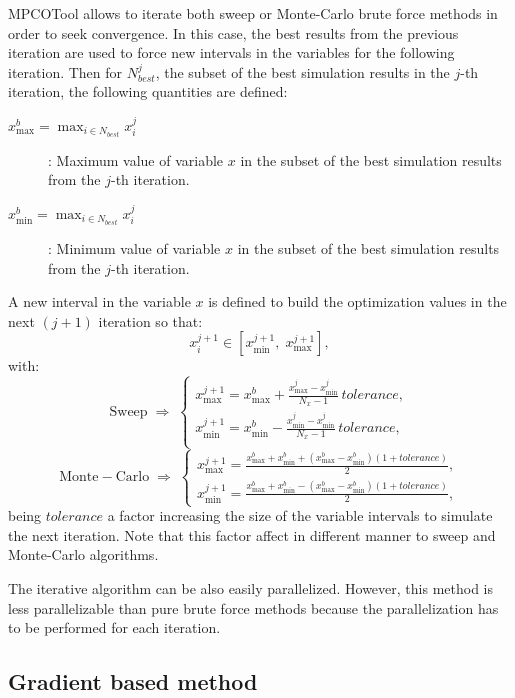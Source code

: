 \documentclass[review,authoryear]{elsarticle}
\newcommand{\EQ}[2]
{\begin{equation}#1\label{#2}\end{equation}}
\begin{document}
MPCOTool allows to iterate both sweep or Monte-Carlo brute force methods in
order to seek convergence. In this case, the best results from the previous
iteration are used to force new intervals in the variables for the following
iteration. Then for $N_{best}^j$, the subset of the best simulation results in
the $j$-th iteration, the following quantities are defined:
\begin{description}
\item[$\displaystyle x_{\max}^b=\max_{i\in N_{best}}x_i^j$]: Maximum value of
	variable $x$ in the subset of the best simulation results from the $j$-th
	iteration.
\item[$\displaystyle x_{\min}^b=\max_{i\in N_{best}}x_i^j$]: Minimum value of
	variable $x$ in the subset of the best simulation results from the $j$-th
	iteration.
\end{description}
A new interval in the variable $x$ is defined to build the optimization values in the next $(j+1)$ iteration so that:
\EQ{x_i^{j+1}\in\left[x_{\min}^{j+1},\;x_{\max}^{j+1}\right],}
{EqIterationInterval}
with:
\[
	\mathrm{Sweep}\;\Rightarrow\;\left\{\begin{array}{c}
	\displaystyle
	x_{\max}^{j+1}=x_{\max}^b+\frac{x_{\max}^j-x_{\min}^j}{N_x-1}\,tolerance,\\
	\displaystyle
	x_{\min}^{j+1}=x_{\min}^b-\frac{x_{\min}^j-x_{\min}^j}{N_x-1}\,tolerance,\\
	\end{array}\right.
\]
\EQ
{
	\mathrm{Monte-Carlo}\;\Rightarrow\;\left\{\begin{array}{c}
	\displaystyle x_{\max}^{j+1}=\frac{x_{\max}^b+x_{\min}^b
	+\left(x_{\max}^b-x_{\min}^b\right)(1+tolerance)}{2},\\
	\displaystyle x_{\min}^{j+1}=\frac{x_{\max}^b+x_{\min}^b
	-\left(x_{\max}^b-x_{\min}^b\right)(1+tolerance)}{2},
	\end{array}\right.
}{EqIterationTolerance}
being $tolerance$ a factor increasing the size of the variable intervals to
simulate the next iteration. Note that this factor affect in different manner to
sweep and Monte-Carlo algorithms.

The iterative algorithm can be also easily parallelized. However, this method is
less parallelizable than pure brute force methods because the parallelization
has to be performed for each iteration.

\subsection{Gradient based method}
\end{document}
